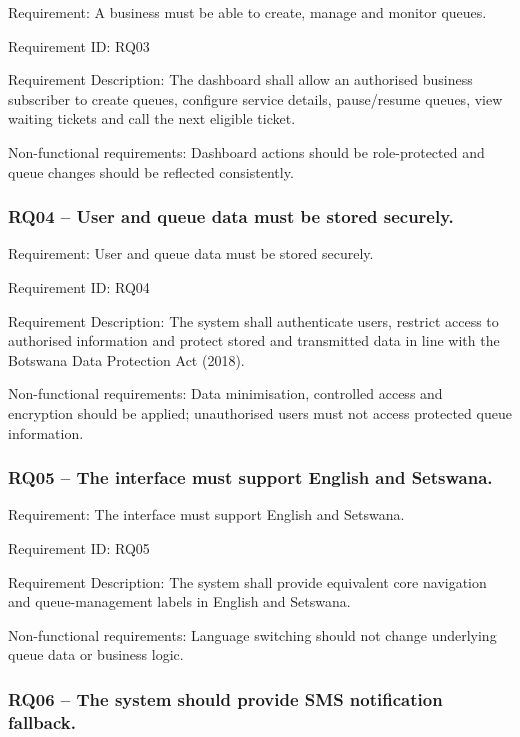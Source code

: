 \documentclass[
]{article}
\begin{document}
Requirement: A business must be able to create, manage and monitor
queues.

Requirement ID: RQ03

Requirement Description: The dashboard shall allow an authorised
business subscriber to create queues, configure service details,
pause/resume queues, view waiting tickets and call the next eligible
ticket.

Non-functional requirements: Dashboard actions should be role-protected
and queue changes should be reflected consistently.

\subsubsection{RQ04 -- User and queue data must be stored
securely.}\label{rq04-user-and-queue-data-must-be-stored-securely.}

Requirement: User and queue data must be stored securely.

Requirement ID: RQ04

Requirement Description: The system shall authenticate users, restrict
access to authorised information and protect stored and transmitted data
in line with the Botswana Data Protection Act (2018).

Non-functional requirements: Data minimisation, controlled access and
encryption should be applied; unauthorised users must not access
protected queue information.

\subsubsection{RQ05 -- The interface must support English and
Setswana.}\label{rq05-the-interface-must-support-english-and-setswana.}

Requirement: The interface must support English and Setswana.

Requirement ID: RQ05

Requirement Description: The system shall provide equivalent core
navigation and queue-management labels in English and Setswana.

Non-functional requirements: Language switching should not change
underlying queue data or business logic.

\subsubsection{RQ06 -- The system should provide SMS notification
fallback.}\label{rq06-the-system-should-provide-sms-notification-fallback.}
\end{document}
